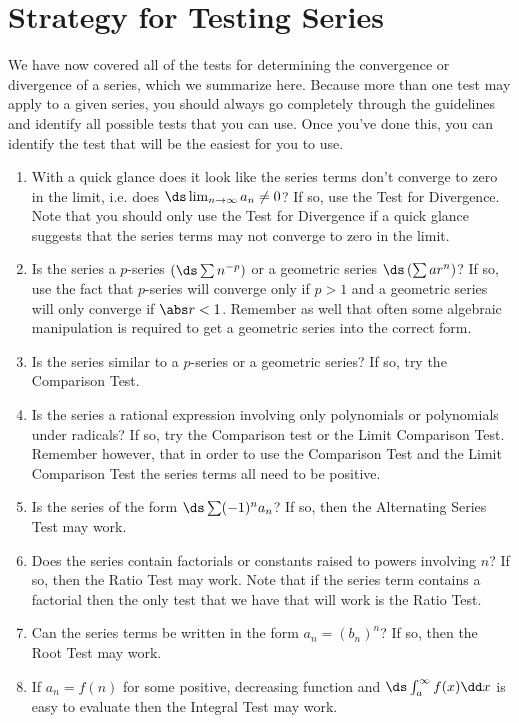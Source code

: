\section{Strategy for Testing Series}\label{sec:series_techniques}

We have now covered all of the tests for determining the convergence or divergence of a series, which we summarize here. Because more than one test may apply to a given series, you should always go completely through the guidelines and identify all possible tests that you can use. Once you've done this, you can identify the test that will be the easiest for you to use.

\begin{enumerate}
\item With a quick glance does it look like the series terms don't converge to zero in the limit, i.e. does $\ds \lim_{n\to \infty}a_n \neq 0$? If so, use the Test for Divergence. Note that you should only use the Test for Divergence if a quick glance suggests that the series terms may not converge to zero in the limit.

\item Is the series a $p$-series $\left(\ds\sum n^{-p}\right)$ or a geometric series $\ds \left( \sum ar^n\right)$? If so, use the fact that $p$-series will converge only  if $p>1$ and a geometric series will only converge if $\abs r<1$. Remember as well that often some algebraic manipulation is required to get a geometric series into the correct form.

\item Is the series similar to a $p$-series or a geometric series? If so, try the Comparison Test.

\item Is the series a rational expression involving only polynomials or polynomials under radicals? If so, try the Comparison test or the Limit Comparison Test. Remember however, that in order to use the Comparison Test and the Limit Comparison Test the series terms all need to be positive.

\item Is the series of the form $\ds \sum (-1)^n a_n$? If so, then the Alternating Series Test may work.

\item Does the series contain factorials or constants raised to powers involving $n$? If so, then the Ratio Test may work. Note that if the series term contains a factorial then the only test that we have that will work is the Ratio Test.

\item Can the series terms be written in the form $a_n=(b_n)^n$? If so, then the Root Test may work.

\item If $a_n=f(n)$ for some positive, decreasing function and $\ds \int_a^\infty f(x)\dd x$ is easy to evaluate then the Integral Test may work.
\end{enumerate}

